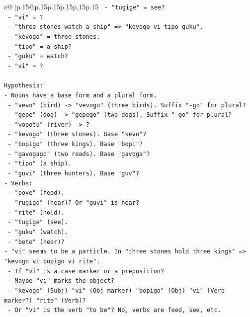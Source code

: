 \documentclass{article}
\begin{document}
{\begin{supertabular}{c@{$\;$}|p{.15\linewidth}@{}p{.15\linewidth}p{.15\linewidth}p{.15\linewidth}p{.15\linewidth}p{.15\linewidth}}
{{{\texttt{        {-} "tugige" = see?} \\
\texttt{        {-} "vi" = ?} \\
\texttt{      {-} "three stones watch a ship" => "kevogo vi tipo guku".} \\
\texttt{        {-} "kevogo" = three stones.} \\
\texttt{        {-} "tipo" = a ship?} \\
\texttt{        {-} "guku" = watch?} \\
\texttt{        {-} "vi" = ?} \\
\\ 
\texttt{Hypothesis:} \\
\texttt{{-} Nouns have a base form and a plural form.} \\
\texttt{  {-} "vevo" (bird) {-}> "vevogo" (three birds). Suffix "{-}go" for plural?} \\
\texttt{  {-} "gepe" (dog) {-}> "gepego" (two dogs). Suffix "{-}go" for plural?} \\
\texttt{  {-} "vopotu" (river) {-}> ?} \\
\texttt{  {-} "kevogo" (three stones). Base "kevo"?} \\
\texttt{  {-} "bopigo" (three kings). Base "bopi"?} \\
\texttt{  {-} "gavogago" (two roads). Base "gavoga"?} \\
\texttt{  {-} "tipo" (a ship).} \\
\texttt{  {-} "guvi" (three hunters). Base "guv"?} \\
\texttt{{-} Verbs:} \\
\texttt{  {-} "pove" (feed).} \\
\texttt{  {-} "rugigo" (hear)? Or "guvi" is hear?} \\
\texttt{  {-} "rite" (hold).} \\
\texttt{  {-} "tugige" (see).} \\
\texttt{  {-} "guku" (watch).} \\
\texttt{  {-} "bete" (hear)?} \\
\texttt{{-} "vi" seems to be a particle. In "three stones hold three kings" => "kevogo vi bopigo vi rite".} \\
\texttt{  {-} If "vi" is a case marker or a preposition?} \\
\texttt{  {-} Maybe "vi" marks the object?} \\
\texttt{  {-} "kevogo" (Subj) "vi" (Obj marker) "bopigo" (Obj) "vi" (Verb marker?) "rite" (Verb)?} \\
\texttt{  {-} Or "vi" is the verb "to be"? No, verbs are feed, see, etc.} \\
}}}
\end{supertabular}}
\end{document}
